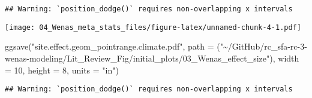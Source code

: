 \documentclass[
]{article}
\newenvironment{Shaded}{\begin{snugshade}}{\end{snugshade}}
\newcommand{\AttributeTok}[1]{\textcolor[rgb]{0.77,0.63,0.00}{#1}}
\newcommand{\DecValTok}[1]{\textcolor[rgb]{0.00,0.00,0.81}{#1}}
\newcommand{\FunctionTok}[1]{\textcolor[rgb]{0.00,0.00,0.00}{#1}}
\newcommand{\NormalTok}[1]{#1}
\newcommand{\StringTok}[1]{\textcolor[rgb]{0.31,0.60,0.02}{#1}}
\begin{document}
\begin{verbatim}
## Warning: `position_dodge()` requires non-overlapping x intervals
\end{verbatim}

\texttt{[image: 04\_Wenas\_meta\_stats\_files/figure-latex/unnamed-chunk-4-1.pdf]}

\begin{Shaded}
\begin{Highlighting}[]
\FunctionTok{ggsave}\NormalTok{(}\StringTok{"site.effect.geom\_pointrange.climate.pdf"}\NormalTok{,}
       \AttributeTok{path =}\NormalTok{ (}\StringTok{"\textasciitilde{}/GitHub/rc\_sfa{-}rc{-}3{-}wenas{-}modeling/Lit\_Review\_Fig/initial\_plots/03\_Wenas\_effect\_size"}\NormalTok{),}
       \AttributeTok{width =} \DecValTok{10}\NormalTok{, }\AttributeTok{height =} \DecValTok{8}\NormalTok{, }\AttributeTok{units =} \StringTok{"in"}\NormalTok{)}
\end{Highlighting}
\end{Shaded}

\begin{verbatim}
## Warning: `position_dodge()` requires non-overlapping x intervals
\end{verbatim}
\end{document}
